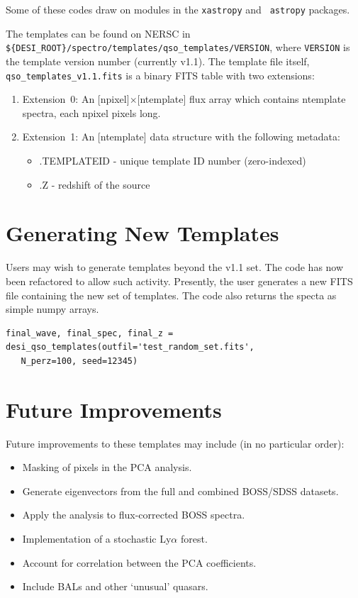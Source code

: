 \documentclass[11pt]{article}
\begin{document}
Some of these codes draw on modules in the {\tt xastropy} and {\tt
  astropy} packages.

\vskip 0.2in


The templates can be found on NERSC in {\tt
  \$\{DESI\_ROOT\}/spectro/templates/qso\_templates/VERSION}, where
{\tt VERSION} is the template version number (currently v1.1).  The
template file itself, {\tt qso\_templates\_v1.1.fits} is a binary FITS
table with two extensions:

\begin{enumerate}
\item Extension~0: An [{\sc npixel}]$\times$[{\sc ntemplate}] flux
  array which contains {\sc ntemplate} spectra, each {\sc npixel}
  pixels long.
\item Extension~1: An [{\sc ntemplate}] data structure with the
  following metadata:
\begin{itemize}
\item{.{\sc TEMPLATEID} - unique template ID number (zero-indexed)}
\item{.{\sc Z} - redshift of the source}
\end{itemize}
\end{enumerate}

\section{Generating New Templates}\label{sec:new_templ}

Users may wish to generate templates beyond the v1.1 set.
The code has now been refactored to allow such activity.
Presently, the user generates a new FITS file containing 
the new set of templates.  The code also returns the specta
as simple numpy arrays.

\begin{Verbatim}[commandchars=\\\{\}]
final_wave, final_spec, final_z = desi_qso_templates(outfil='test_random_set.fits', 
   N_perz=100, seed=12345)
\end{Verbatim}

\section{Future Improvements}\label{sec:future}

Future improvements to these templates may include (in no particular
order): 

\begin{itemize}
\item Masking of pixels in the PCA analysis.
\item Generate eigenvectors from the full and combined BOSS/SDSS datasets.
\item Apply the analysis to flux-corrected BOSS spectra.
\item Implementation of a stochastic Ly$\alpha$ forest.
\item Account for correlation between the PCA coefficients. 
\item Include BALs and other `unusual' quasars.
\end{itemize}

%
%
%
\end{document}
